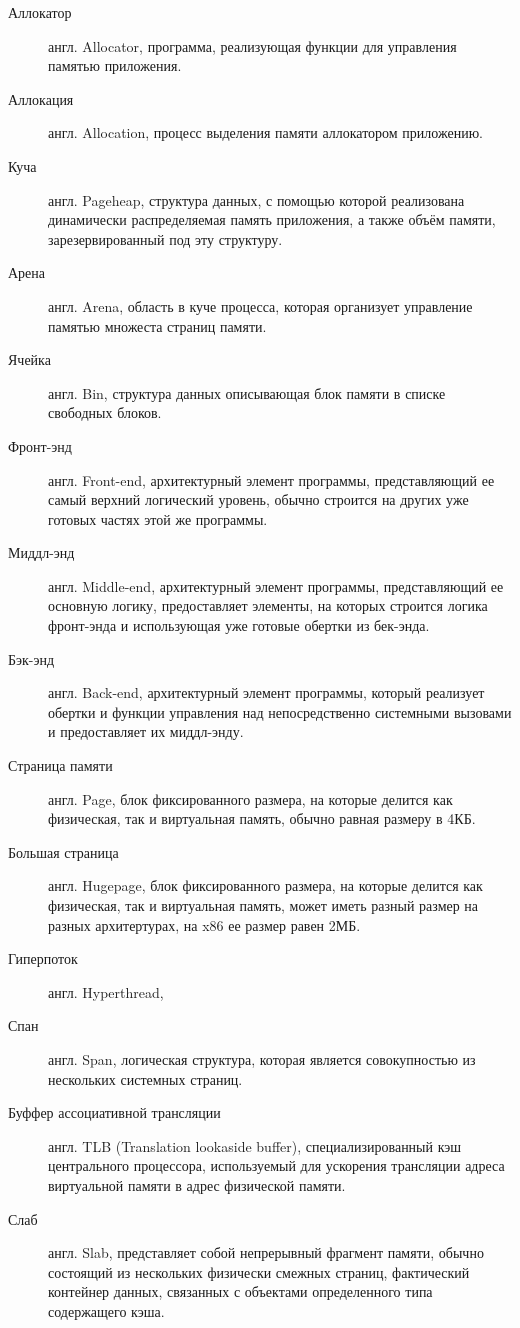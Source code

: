 \Defines %
\begin{description}
	\item[Аллокатор] англ. Allocator, программа, реализующая функции для управления памятью приложения.
	\item[Аллокация] англ. Allocation, процесс выделения памяти аллокатором приложению.
	\item[Куча] англ. Pageheap, структура данных, с помощью которой реализована динамически распределяемая память приложения, а также объём памяти, зарезервированный под эту структуру.
	\item[Арена] англ. Arena, область в куче процесса, которая организует управление памятью множеста страниц памяти.
	\item[Ячейка] англ. Bin, структура данных описывающая блок памяти в списке свободных блоков.
	\item[Фронт-энд] англ. Front-end, архитектурный элемент программы, представляющий ее самый верхний логический уровень, обычно строится на других уже готовых частях этой же программы.
	\item[Миддл-энд] англ. Middle-end, архитектурный элемент программы, представляющий ее основную логику, предоставляет элементы, на которых строится логика фронт-энда и использующая уже готовые обертки из бек-энда.
	\item[Бэк-энд] англ. Back-end, архитектурный элемент программы, который реализует обертки и функции управления над непосредственно системными вызовами и предоставляет их миддл-энду.
	\item[Страница памяти] англ. Page, блок фиксированного размера, на которые делится как физическая, так и виртуальная память, обычно равная размеру в 4КБ.
	\item[Большая страница] англ. Hugepage, блок фиксированного размера, на которые делится как физическая, так и виртуальная память, может иметь разный размер на разных архитертурах, на x86 ее размер равен 2МБ.
	\item[Гиперпоток] англ. Hyperthread, 
	\item[Спан] англ. Span, логическая структура, которая является совокупностью из нескольких системных страниц.
	\item[Буффер ассоциативной трансляции] англ. TLB (Translation lookaside buffer), специализированный кэш центрального процессора, используемый для ускорения трансляции адреса виртуальной памяти в адрес физической памяти.
	\item[Слаб] англ. Slab, представляет собой непрерывный фрагмент памяти, обычно состоящий из нескольких физически смежных страниц, фактический контейнер данных, связанных с объектами определенного типа содержащего кэша.
\end{description}


